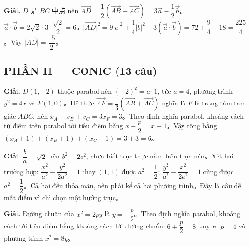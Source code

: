 \documentclass[11pt, a4paper]{article}
\begin{document}
\begin{dapan}[12 — Đáp án C]

\textbf{Giải.} $D$ 是 $BC$ 中点 nên $\overrightarrow{AD}=\dfrac{1}{2}(\overrightarrow{AB}+\overrightarrow{AC})=3\overrightarrow{a}-\dfrac{1}{2}\overrightarrow{b}$。$\overrightarrow{a}\cdot\overrightarrow{b}=2\sqrt{2}\cdot3\cdot\dfrac{\sqrt{2}}{2}=6$。$\lvert\overrightarrow{AD}\rvert^2=9\lvert a\rvert^2+\dfrac{1}{4}\lvert b\rvert^2-3(\overrightarrow{a}\cdot\overrightarrow{b})=72+\dfrac{9}{4}-18=\dfrac{225}{4}$。Vậy $\lvert\overrightarrow{AD}\rvert=\dfrac{15}{2}$。

\subsection{PHẦN II — CONIC (13 câu)}


\end{dapan}
\vspace{0.3cm}
\begin{dapan}[13 — Đáp án D]

\textbf{Giải.} $D(1,-2)$ thuộc parabol nên $(-2)^2=a\cdot1$, tức $a=4$, phương trình $y^2=4x$ và $F(1,0)$。Hệ thức $\overrightarrow{AF}=\dfrac{1}{3}(\overrightarrow{AB}+\overrightarrow{AC})$ nghĩa là $F$ là trọng tâm tam giác $ABC$, nên $x_A+x_B+x_C=3x_F=3$。Theo định nghĩa parabol, khoảng cách từ điểm trên parabol tới tiêu điểm bằng $x+\dfrac{p}{2}=x+1$。Vậy tổng bằng $(x_A+1)+(x_B+1)+(x_C+1)=3+3=6$。


\end{dapan}
\vspace{0.3cm}
\begin{dapan}[14 — Đáp án B]

\textbf{Giải.} $\dfrac{b}{a}=\sqrt{2}$ nên $b^2=2a^2$, chưa biết trục thực nằm trên trục nào。Xét hai trường hợp: $\dfrac{x^2}{a^2}-\dfrac{y^2}{2a^2}=1$ thay $(1,1)$ được $a^2=\dfrac{1}{2}$; $\dfrac{y^2}{a^2}-\dfrac{x^2}{2a^2}=1$ cũng được $a^2=\dfrac{1}{2}$。Cả hai đều thỏa mãn, nên phải kể cả hai phương trình。Đây là câu dễ mất điểm vì chỉ chọn một hướng trục。


\end{dapan}
\vspace{0.3cm}
\begin{dapan}[15 — Đáp án D]

\textbf{Giải.} Đường chuẩn của $x^2=2py$ là $y=-\dfrac{p}{2}$。Theo định nghĩa parabol, khoảng cách tới tiêu điểm bằng khoảng cách tới đường chuẩn: $6+\dfrac{p}{2}=8$, suy ra $p=4$ và phương trình $x^2=8y$。


\end{dapan}
\end{document}
